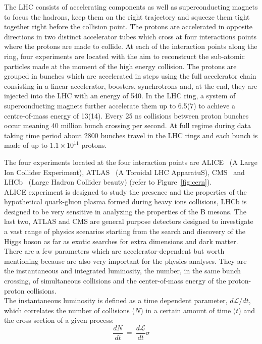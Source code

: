 The LHC consists of accelerating components as well as
superconducting magnets to focus the hadrons, keep them on the right
trajectory and squeeze them tight together right before the
collision point. 
The protons are accelerated in opposite directions in two distinct
accelerator tubes which cross at four interactions points where the
protons are made to collide. At each of the interaction points along the ring,
four experiments are located with the aim to reconstruct the
sub-atomic particles made at the moment of the high energy collision.
The protons are grouped in bunches which are
accelerated in steps using the full accelerator chain consisting in a linear
accelerator, boosters, synchrotrons and, at the end, they are injected
into the LHC with an energy of 540\GeV. In the LHC ring, a system of
superconducting magnets further accelerate them up to 6.5\TeV (7\TeV)
to achieve a centre-of-mass energy of 13\TeV (14\TeV). Every
25 ns collisions between proton bunches occur meaning 40 million
bunch crossing per second. At full regime during data taking time
period about 2800 bunches travel in the LHC rings and each bunch is
made of up to $1.1\times10^{11}$ protons.

The four experiments located at the four interaction points are
ALICE~\cite{alice_2008} (A Large Ion Collider Experiment),
ATLAS~\cite{atlas_2008} (A Toroidal LHC ApparatuS),
CMS~\cite{cms_2008} and LHCb~\cite{lhcb_2008} (Large Hadron Collider
beauty) (refer to Figure~\ref{fig:cern}).\\
 ALICE experiment is designed
to study the presence and the properties of the hypothetical
quark-gluon plasma formed during heavy ions collisions, LHCb is
designed to be very sensitive in analyzing the properties of the B
mesons. The last two, ATLAS and CMS are general purpose detectors
designed to investigate a vast range of physics scenarios starting
from the search and discovery of the Higgs boson as far as exotic
searches for extra dimensions
and dark matter. \\

There are a few parameters which are accelerator-dependent but worth
mentioning because are also very important for the
physics analyses. They are the instantaneous and integrated luminosity, the
number, in the same bunch crossing, of simultaneous collisions and the
center-of-mass energy of the proton-proton collisions.\\
The instantaneous luminosity is defined as a time dependent
parameter, $d\mathcal{L}/dt$, which correlates the number of collisions
($N$) in a certain amount of time ($t$) and the cross section of a
given process:
\begin{equation}
\label{eq:instalumi}
\frac{dN}{dt} \: = \: \frac{d\mathcal{L}}{dt}\sigma
\end{equation}

